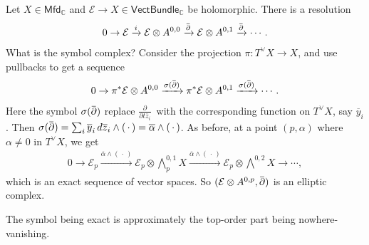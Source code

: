\begin{example}

Let \(X\in {\mathsf{Mfd}}_{\mathbb{C}}\) and
\(\mathcal{E}\to X \in {\mathsf{VectBundle}}_{\mathbb{C}}\) be
holomorphic. There is a resolution
\begin{align*}
0 \to \mathcal{E} \xrightarrow{i} \mathcal{E} \otimes A^{0, 0} \xrightarrow{\mkern 1.5mu\overline{\mkern-1.5mu{\partial}\mkern-1.5mu}\mkern 1.5mu} \mathcal{E} \otimes A^{0, 1} \xrightarrow{\mkern 1.5mu\overline{\mkern-1.5mu{\partial}\mkern-1.5mu}\mkern 1.5mu} \cdots
.\end{align*}
What is the symbol complex? Consider the projection
\(\pi: T^\vee X\to X\), and use pullbacks to get a sequence
\begin{align*}
0 \to \pi^* \mathcal{E} \otimes A^{0, 0} \xrightarrow{\sigma( \mkern 1.5mu\overline{\mkern-1.5mu{\partial}\mkern-1.5mu}\mkern 1.5mu)} \pi^* \mathcal{E} \otimes A^{0, 1} \xrightarrow{\sigma( \mkern 1.5mu\overline{\mkern-1.5mu{\partial}\mkern-1.5mu}\mkern 1.5mu)} \cdots
.\end{align*}
Here the symbol
\(\sigma(\mkern 1.5mu\overline{\mkern-1.5mu{\partial}\mkern-1.5mu}\mkern 1.5mu)\)
replace \({\frac{\partial }{\partial t {\overline{{z}}}_i}\,}\) with the
corresponding function on \(T^\vee X\), say \({\overline{{y}}}_i\). Then
\(\sigma( \mkern 1.5mu\overline{\mkern-1.5mu{\partial}\mkern-1.5mu}\mkern 1.5mu) = \sum_i {\overline{{y}}}_i \, d{\overline{{z}}}_i \wedge ({\,\cdot\,}) = {\overline{{ \alpha }}} \wedge ({\,\cdot\,})\).
As before, at a point \((p, \alpha)\) where \(\alpha\neq 0\) in
\(T^\vee X\), we get
\begin{align*}
0 \to \mathcal{E}_p \xrightarrow{{\overline{{ \alpha}}} \wedge ({\,\cdot\,})} \mathcal{E}_p \otimes\bigwedge^{0, 1}_p X \xrightarrow{{\overline{{ \alpha }}} \wedge ({\,\cdot\,})} \mathcal{E}_p \otimes\bigwedge^{0, 2} X \to \cdots
,\end{align*}
which is an exact sequence of vector spaces. So
\(( \mathcal{E} \otimes A^{0, p}, \mkern 1.5mu\overline{\mkern-1.5mu{\partial}\mkern-1.5mu}\mkern 1.5mu)\)
is an elliptic complex.

\end{example}

\begin{slogan}

The symbol being exact is approximately the top-order part being
nowhere-vanishing.

\end{slogan}

